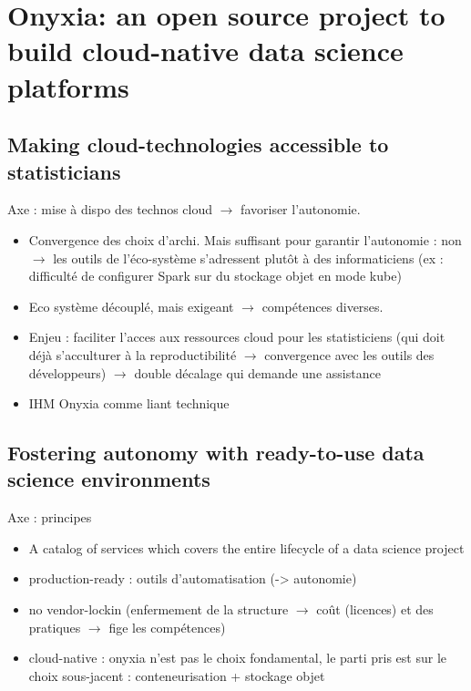 \section{Onyxia: an open source project to build cloud-native data science platforms}

\subsection{Making cloud-technologies accessible to statisticians}

Axe : mise à dispo des technos cloud $\rightarrow$ favoriser l'autonomie.
\begin{itemize}
    \item Convergence des choix d'archi. Mais suffisant pour garantir l'autonomie : non $\rightarrow$ les outils de l'éco-système s'adressent plutôt à des informaticiens (ex : difficulté de configurer Spark sur du stockage objet en mode kube)
    \item Eco système découplé, mais exigeant $\rightarrow$ compétences diverses.
    \item Enjeu : faciliter l'acces aux ressources cloud pour les statisticiens (qui doit déjà s'acculturer à la reproductibilité $\rightarrow$ convergence avec les outils des développeurs) $\rightarrow$ double décalage qui demande une assistance
    \item IHM Onyxia comme liant technique
\end{itemize}

\subsection{Fostering autonomy with ready-to-use data science environments}

Axe : principes
\begin{itemize}
    \item A catalog of services which covers the entire lifecycle of a data science project
    \item production-ready : outils d'automatisation (-> autonomie)
    \item no vendor-lockin (enfermement de la structure $\rightarrow$ coût (licences) et des pratiques $\rightarrow$ fige les compétences)
    \item cloud-native : onyxia n'est pas le choix fondamental, le parti pris est sur le choix sous-jacent : conteneurisation + stockage objet
\end{itemize}


